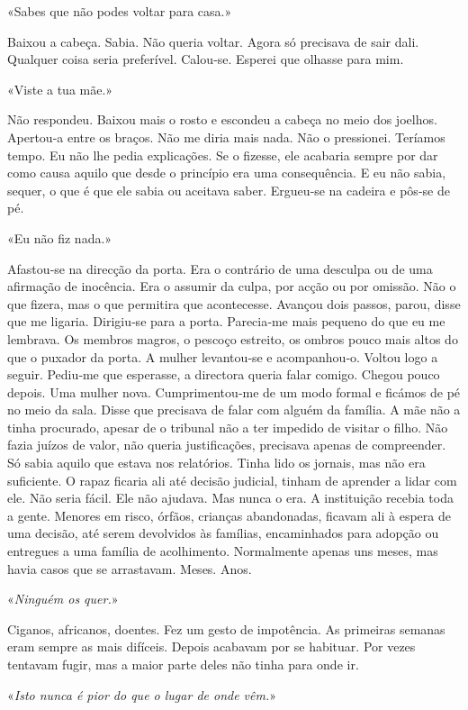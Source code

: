 «Sabes que não podes voltar para casa.»

Baixou a cabeça. Sabia. Não queria voltar. Agora só precisava de sair
dali. Qualquer coisa seria preferível. Calou­‑se. Esperei que olhasse
para mim.

«Viste a tua mãe.»

Não respondeu. Baixou mais o rosto e escondeu a cabeça no meio dos
joelhos. Apertou­‑a entre os braços. Não me diria mais nada. Não o
pressionei. Teríamos tempo. Eu não lhe pedia explicações. Se o fizesse,
ele acabaria sempre por dar como causa aquilo que desde o princípio era
uma consequência. E eu não sabia, sequer, o que é que ele sabia ou
aceitava saber. Ergueu­‑se na cadeira e pôs­‑se de pé.

«Eu não fiz nada.»

Afastou­‑se na direcção da porta. Era o contrário de uma desculpa ou de
uma afirmação de inocência. Era o assumir da culpa, por acção ou por
omissão. Não o que fizera, mas o que permitira que acontecesse. Avançou
dois passos, parou, disse que me ligaria. Dirigiu­‑se para a porta.
Parecia­‑me mais pequeno do que eu me lembrava. Os membros magros, o
pescoço estreito, os ombros pouco mais altos do que o puxador da porta.
A mulher levantou­‑se e acompanhou­‑o. Voltou logo a seguir. Pediu­‑me
que esperasse, a directora queria falar comigo. Chegou pouco depois. Uma
mulher nova. Cumprimentou­‑me de um modo formal e ficámos de pé no meio
da sala. Disse que precisava de falar com alguém da família. A mãe não a
tinha procurado, apesar de o tribunal não a ter impedido de visitar o
filho. Não fazia juízos de valor, não queria justificações, precisava
apenas de compreender. Só sabia aquilo que estava nos relatórios. Tinha
lido os jornais, mas não era suficiente. O rapaz ficaria ali até decisão
judicial, tinham de aprender a lidar com ele. Não seria fácil. Ele não
ajudava. Mas nunca o era. A instituição recebia toda a gente. Menores em
risco, órfãos, crianças abandonadas, ficavam ali à espera de uma
decisão, até serem devolvidos às famílias, encaminhados para adopção ou
entregues a uma família de acolhimento. Normalmente apenas uns meses,
mas havia casos que se arrastavam. Meses. Anos.

«\emph{Ninguém os quer.}»

Ciganos, africanos, doentes. Fez um gesto de impotência. As primeiras
semanas eram sempre as mais difíceis. Depois acabavam por se habituar.
Por vezes tentavam fugir, mas a maior parte deles não tinha para onde
ir.

«\emph{Isto nunca é pior do que o lugar de onde vêm.}»

